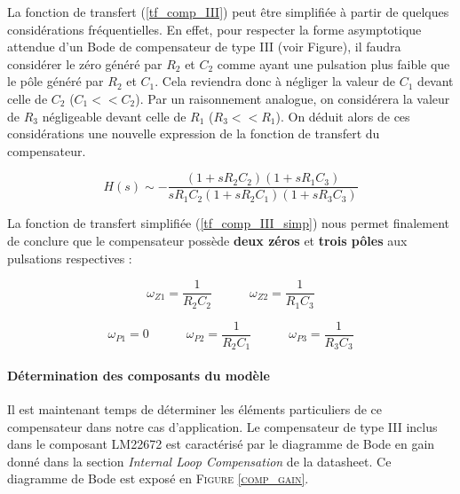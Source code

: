 				La fonction de transfert (\ref{tf_comp_III}) peut être simplifiée 
				à partir de quelques considérations fréquentielles. En effet, pour 
				respecter la forme asymptotique attendue d'un Bode de compensateur 
				de type III (voir Figure), il faudra considérer le zéro généré par 
				$R_2$ et $C_2$ comme ayant une pulsation plus faible que le pôle 
				généré par $R_2$ et $C_1$. 
				Cela reviendra donc à négliger la valeur de $C_1$ devant celle de 
				$C_2$ ($C_1 << C_2$). 
				Par un raisonnement analogue, on considérera la valeur de $R_3$ 
				négligeable devant celle de $R_1$ ($R_3 << R_1$). 
				On déduit alors de ces considérations une nouvelle expression de 
				la fonction de transfert du compensateur.
					
				\begin{equation}
					H(s) \sim -\frac{(1+s R_2 C_2)(1+sR_1 C_3)}
					{sR_1 C_2 (1+sR_2 C_1) (1+sR_3C_3)}
					\label{tf_comp_III_simp}
				\end{equation}
					
				La fonction de transfert simplifiée (\ref{tf_comp_III_simp}) nous 
				permet finalement de conclure que le compensateur possède 
				\textbf{deux zéros} et \textbf{trois pôles} aux pulsations 
				respectives :
					
				\begin{equation}
					\omega_{Z1} = \frac{1}{R_2C_2}
					\quad\quad\quad
					\omega_{Z2} = \frac{1}{R_1C_3}
				\end{equation}
					
				\begin{equation}
					\omega_{P1} = 0
					\quad\quad\quad
					\omega_{P2} = \frac{1}{R_2C_1}
					\quad\quad\quad
					\omega_{P3} = \frac{1}{R_3C_3}
				\end{equation}
					
				\paragraph{Détermination des composants du modèle}
				
				Il est maintenant temps de déterminer les éléments particuliers 
				de ce compensateur dans notre cas d'application. Le compensateur 
				de type III inclus dans le composant LM22672 est caractérisé par 
				le diagramme de Bode en gain donné dans la section 
				\textit{Internal Loop Compensation} de la datasheet. Ce diagramme 
				de Bode est exposé en \textsc{Figure \ref{comp_gain}}.
										
